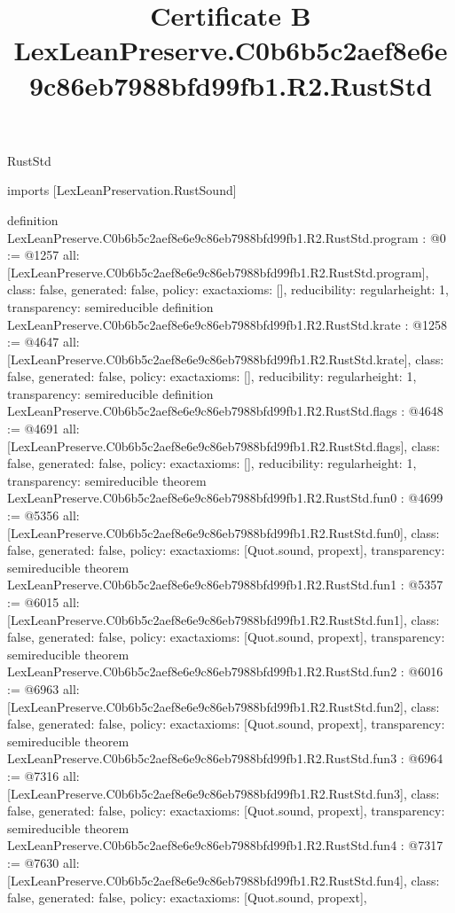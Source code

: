 \begin{lexlean}{RustStd}
\title{Certificate B LexLeanPreserve.C0b6b5c2aef8e6e9c86eb7988bfd99fb1.R2.RustStd}
\begin{coremodule}
imports [LexLeanPreservation.RustSound]

definition LexLeanPreserve.C0b6b5c2aef8e6e9c86eb7988bfd99fb1.R2.RustStd.program : @0 := @1257 {
  all: [LexLeanPreserve.C0b6b5c2aef8e6e9c86eb7988bfd99fb1.R2.RustStd.program],
  class: false,
  generated: false,
  policy: exact{axioms: []},
  reducibility: regular{height: 1},
  transparency: semireducible
}
definition LexLeanPreserve.C0b6b5c2aef8e6e9c86eb7988bfd99fb1.R2.RustStd.krate : @1258 := @4647 {
  all: [LexLeanPreserve.C0b6b5c2aef8e6e9c86eb7988bfd99fb1.R2.RustStd.krate],
  class: false,
  generated: false,
  policy: exact{axioms: []},
  reducibility: regular{height: 1},
  transparency: semireducible
}
definition LexLeanPreserve.C0b6b5c2aef8e6e9c86eb7988bfd99fb1.R2.RustStd.flags : @4648 := @4691 {
  all: [LexLeanPreserve.C0b6b5c2aef8e6e9c86eb7988bfd99fb1.R2.RustStd.flags],
  class: false,
  generated: false,
  policy: exact{axioms: []},
  reducibility: regular{height: 1},
  transparency: semireducible
}
theorem LexLeanPreserve.C0b6b5c2aef8e6e9c86eb7988bfd99fb1.R2.RustStd.fun0 : @4699 := @5356 {
  all: [LexLeanPreserve.C0b6b5c2aef8e6e9c86eb7988bfd99fb1.R2.RustStd.fun0],
  class: false,
  generated: false,
  policy: exact{axioms: [Quot.sound, propext]},
  transparency: semireducible
}
theorem LexLeanPreserve.C0b6b5c2aef8e6e9c86eb7988bfd99fb1.R2.RustStd.fun1 : @5357 := @6015 {
  all: [LexLeanPreserve.C0b6b5c2aef8e6e9c86eb7988bfd99fb1.R2.RustStd.fun1],
  class: false,
  generated: false,
  policy: exact{axioms: [Quot.sound, propext]},
  transparency: semireducible
}
theorem LexLeanPreserve.C0b6b5c2aef8e6e9c86eb7988bfd99fb1.R2.RustStd.fun2 : @6016 := @6963 {
  all: [LexLeanPreserve.C0b6b5c2aef8e6e9c86eb7988bfd99fb1.R2.RustStd.fun2],
  class: false,
  generated: false,
  policy: exact{axioms: [Quot.sound, propext]},
  transparency: semireducible
}
theorem LexLeanPreserve.C0b6b5c2aef8e6e9c86eb7988bfd99fb1.R2.RustStd.fun3 : @6964 := @7316 {
  all: [LexLeanPreserve.C0b6b5c2aef8e6e9c86eb7988bfd99fb1.R2.RustStd.fun3],
  class: false,
  generated: false,
  policy: exact{axioms: [Quot.sound, propext]},
  transparency: semireducible
}
theorem LexLeanPreserve.C0b6b5c2aef8e6e9c86eb7988bfd99fb1.R2.RustStd.fun4 : @7317 := @7630 {
  all: [LexLeanPreserve.C0b6b5c2aef8e6e9c86eb7988bfd99fb1.R2.RustStd.fun4],
  class: false,
  generated: false,
  policy: exact{axioms: [Quot.sound, propext]},
}
\end{coremodule}
\end{lexlean}
